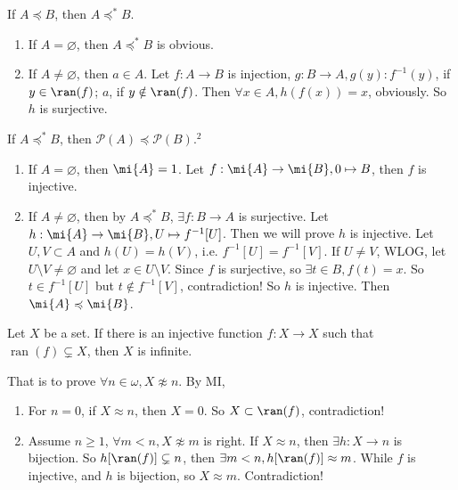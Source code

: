 \documentclass{ctexart}
\begin{document}
\begin{problem}
If $A \preccurlyeq B$, then $A \preccurlyeq^* B$.
\end{problem}
\begin{solution}
    \begin{enumerate}
        \item If $A=\varnothing$, then $A \preccurlyeq^* B$ is obvious. 
        \item If $A\neq \varnothing$, then $a\in A$. Let $f:A\to B$ is injection, $g:B\to A,g(y):f^{-1}(y) $, if $ y\in \ran(f)$; $a $, if $y\notin \ran(f)$. Then $\forall x\in A,h(f(x))=x$, obviously. So $h$ is surjective. 
    \end{enumerate}
\end{solution}

\begin{problem}
If $A \preccurlyeq^* B$, then $\mathscr{P}(A) \preccurlyeq \mathscr{P}(B) .^2$
\end{problem}
\begin{solution}
    \begin{enumerate}
        \item If $A=\varnothing$, then $\mi{A}=1$. Let $f:\mi{A}\to \mi{B},0\mapsto B$, then $f$ is injective.\item If $A\neq \varnothing$, then by $A \preccurlyeq^* B$, $\exists f:B\to A$ is surjective. Let $h:\mi{A}\to\mi{B},U\mapsto f^{-1}[U]$. Then we will prove $h$ is injective. Let $U,V\subset A$ and $h(U)=h(V)$, i.e. $f^{-1}[U]=f^{-1}[V]$. If $U\neq V$, WLOG, let $U\setminus V\neq \varnothing$ and let $x\in U\setminus V$. Since $f$ is surjective, so $\exists t\in B,f(t)=x$. So $t\in f^{-1}[U]$ but $t\notin f^{-1}[V]$, contradiction! So $h$ is injective. Then $\mi{A}\peq \mi{B}$. 
    \end{enumerate}
     
   \end{solution}

\begin{problem}
Let $X$ be a set. If there is an injective function $f: X \rightarrow X$ such that $\operatorname{ran}(f) \subsetneq X$, then $X$ is infinite.
\end{problem}
\begin{solution}
    That is to prove $\forall n\in \omega,X\not\approx n$. By MI, 
    \begin{enumerate}
        \item For $n=0$, if $X\approx n$, then $X=0$. So $X\subset \ran(f)$, contradiction! 
        \item Assume $n\geq 1$, $\forall m<n,X\not\approx m$ is right. If $X\approx n$, then $\exists h:X\to n$ is bijection. So $h[\ran(f)]\subsetneq n$, then $\exists m<n,h[\ran(f)]\approx m$. While $f$ is injective, and $h$ is bijection, so $X\approx m$. Contradiction!
    \end{enumerate}
   \end{solution}
   
\end{document}
